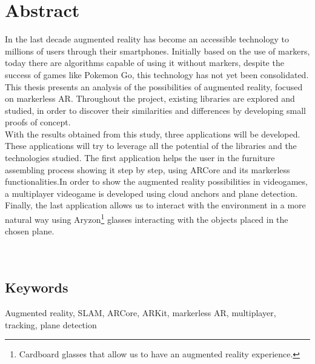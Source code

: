 \newpage
\chapter*{Abstract}
In the last decade augmented reality has become an accessible technology to millions of users through their smartphones. Initially based on the use of markers, today there are algorithms capable of using it without markers, despite the success of games like Pokemon Go, this technology has not yet been consolidated.\\

This thesis presents an analysis of the possibilities of augmented reality, focused on markerless AR. Throughout the project, existing libraries are explored and studied, in order to discover their similarities and differences by developing small proofs of concept.\\ 

With the results obtained from this study, three applications will be developed. These applications will try to leverage all the potential of the libraries and the technologies studied. The first application helps the user in the furniture assembling process showing it step by step, using ARCore and its markerless functionalities.In order to show the augmented reality possibilities in videogames, a multiplayer videogame is developed using cloud anchors and plane detection.
Finally, the last application allows us to interact with the environment in a more natural way using Aryzon\footnote{Cardboard glasses that allow us to have an augmented reality experience.\cite{Aryzon}} glasses interacting with the objects placed in the chosen plane.
\\
\\
\\

\section*{Keywords}
Augmented reality, SLAM, ARCore, ARKit, markerless AR, multiplayer, tracking, plane detection
\noindent
\noindent

